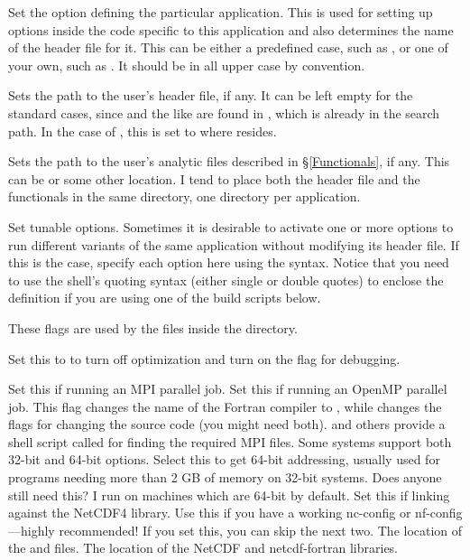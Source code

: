 \begin{klist}

 Set the  option defining the particular
application. This is used for setting up options inside the code
specific to this application and also determines the name of the
 header file for it. This can be either a predefined
case, such as , or one of your own, such as .
It should be in all upper case by convention.

 Sets the path to the user's header file, if
any. It can be left empty for the standard cases, since 
and the like are found in , which is already in
the search path. In the case of , this is set to
 where  resides.

 Sets the path to the user's analytic files
described in \S\ref{Functionals}, if any. This can be 
or some other location. I tend to place both the header file and the
functionals in the same directory, one directory per application.

 Set tunable  options. Sometimes it is desirable
to activate one or more  options to run different variants of the
same application without modifying its header file. If this is the
case, specify each option here using the  syntax. Notice that
you need to use the shell's quoting syntax (either single or double
quotes) to enclose the definition if you are using one of the build
scripts below.


 These flags are used by the files
inside the  directory.
\begin{klist}
   Set this to  to turn off optimization
and turn on the  flag for debugging.

   Set this if running an MPI parallel job.
   Set this if running an OpenMP parallel job.
   This flag changes the name of the
  Fortran compiler to , while
   changes the  flags
  for changing the source code (you might need both).  and others
  provide a shell script called  for finding the required MPI
  files.
    Some systems support both 32-bit and 64-bit
  options. Select this to get 64-bit addressing, usually used for
  programs needing more than 2 GB of memory on 32-bit systems. Does
  anyone still need this? I run on machines which are 64-bit by default.
   Set this if linking against the NetCDF4
  library. Use this if you have a working nc-config or nf-config---highly
  recommended! If you set this, you can skip the next two.
   The location of the  and
   files.
   The location of the NetCDF and netcdf-fortran
  libraries.
\end{klist}


\end{klist}
